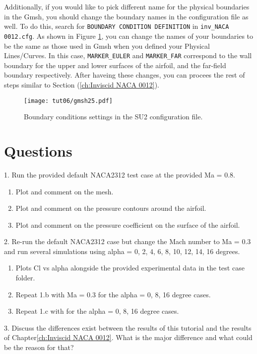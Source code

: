 Additionally, if you would like to pick different name for the physical boundaries in the Gmsh, you should change the boundary names in the configuration file as well. To do this, search for \texttt{BOUNDARY CONDITION DEFINITION} in \texttt{inv\_NACA 0012.cfg}. As shown in Figure \ref{fig6:gmsh25}, you can change the names of your boundaries to be the same as those used in Gmsh when you defined your Physical Lines/Curves. In this case, \texttt{MARKER\_EULER} and \texttt{MARKER\_FAR} correspond to the wall boundary for the upper and lower surfaces of the airfoil, and the far-field boundary respectively. After haveing these changes, you can procees the rest of steps similar to Section (\ref{ch:Inviscid NACA 0012}).
\begin{figure}[ht]
    \centering
    \texttt{[image: tut06/gmsh25.pdf]}
    \caption{Boundary conditions settings in the SU2 configuration file.}
    \label{fig6:gmsh25}
\end{figure}
\section{Questions}
1. Run the provided default NACA2312 test case at the provided Ma = 0.8.
\begin{enumerate}[label=(\alph*)]
    \item Plot and comment on the mesh.
    \item Plot and comment on the pressure contours around the airfoil.
    \item Plot and comment on the pressure coefficient on the surface of the airfoil.
\end{enumerate}
2. Re-run the default NACA2312 case but change the Mach number to Ma = 0.3 and run several simulations using alpha = 0, 2, 4, 6, 8, 10, 12, 14, 16 degrees.
\begin{enumerate}[label=(\alph*)]
    \item Plots Cl vs alpha alongside the provided experimental data\cite{ladson1988effects} in the test case folder.
    \item Repeat 1.b with Ma = 0.3 for the alpha = 0, 8, 16 degree cases.
    \item Repeat 1.c with for the alpha = 0, 8, 16 degree cases.
\end{enumerate}
3. Discuss the differences exist between the results of this tutorial and the results of Chapter\ref{ch:Inviscid NACA 0012}. What is the major difference and what could be the reason for that?
